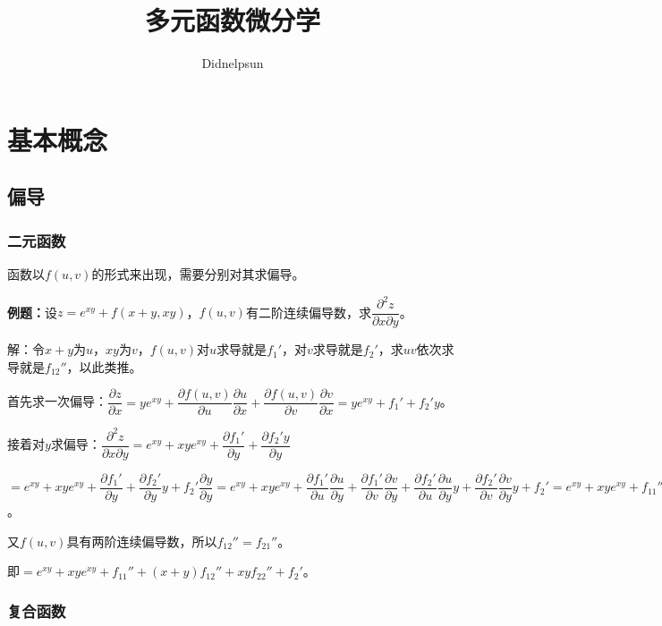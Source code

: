 \documentclass[UTF8, 12pt]{ctexart}
\author{Didnelpsun}
\title{多元函数微分学}
\date{}
\begin{document}
\maketitle
\pagestyle{empty}
\thispagestyle{empty}
\tableofcontents
\thispagestyle{empty}
\newpage
\pagestyle{plain}
\setcounter{page}{1}

\section{基本概念}

\subsection{偏导}

\subsubsection{二元函数}

函数以$f(u,v)$的形式来出现，需要分别对其求偏导。

\textbf{例题：}设$z=e^{xy}+f(x+y,xy)$，$f(u,v)$有二阶连续偏导数，求$\dfrac{\partial^2z}{\partial x\partial y}$。

解：令$x+y$为$u$，$xy$为$v$，$f(u,v)$对$u$求导就是$f_1'$，对$v$求导就是$f_2'$，求$uv$依次求导就是$f_{12}''$，以此类推。

首先求一次偏导：$\dfrac{\partial z}{\partial x}=ye^{xy}+\dfrac{\partial f(u,v)}{\partial u}\dfrac{\partial u}{\partial x}+\dfrac{\partial f(u,v)}{\partial v}\dfrac{\partial v}{\partial x}=ye^{xy}+f_1'+f_2'y$。

接着对$y$求偏导：$\dfrac{\partial^2z}{\partial x\partial y}=e^{xy}+xye^{xy}+\dfrac{\partial f_1'}{\partial y}+\dfrac{\partial f_2'y}{\partial y}$

$=e^{xy}+xye^{xy}+\dfrac{\partial f_1'}{\partial y}+\dfrac{\partial f_2'}{\partial y}y+f_2'\dfrac{\partial y}{\partial y}=e^{xy}+xye^{xy}+\dfrac{\partial f_1'}{\partial u}\dfrac{\partial u}{\partial y}+\dfrac{\partial f_1'}{\partial v}\dfrac{\partial v}{\partial y}+\dfrac{\partial f_2'}{\partial u}\dfrac{\partial u}{\partial y}y+\dfrac{\partial f_2'}{\partial v}\dfrac{\partial v}{\partial y}y+f_2'=e^{xy}+xye^{xy}+f_{11}''+f_{12}''x+f_{21}''y+f_{22}''xy+f_2'$。\medskip

又$f(u,v)$具有两阶连续偏导数，所以$f_{12}''=f_{21}''$。

即$=e^{xy}+xye^{xy}+f_{11}''+(x+y)f_{12}''+xyf_{22}''+f_2'$。

\subsubsection{复合函数}
\end{document}
